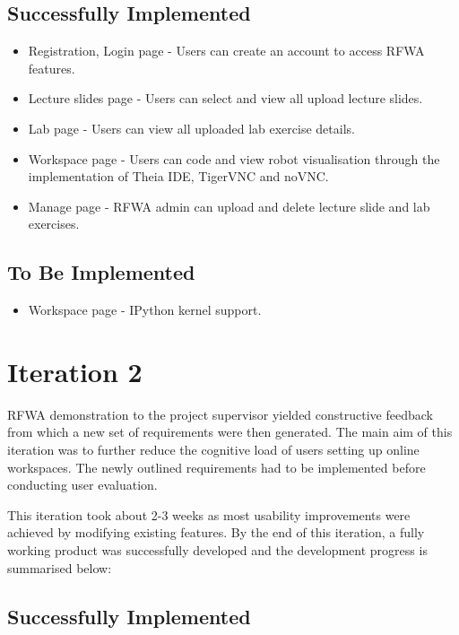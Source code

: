 \documentclass{l4proj}
\begin{document}
\subsection{Successfully Implemented}

\begin{itemize}
    \item 
    Registration, Login page - Users can create an account to access RFWA features.
    \item 
    Lecture slides page - Users can select and view all upload lecture slides.
    \item 
    Lab page - Users can view all uploaded lab exercise details.
    \item 
    Workspace page - Users can code and view robot visualisation through the implementation of Theia IDE, TigerVNC and noVNC.
    \item
    Manage page - RFWA admin can upload and delete lecture slide and lab exercises.
\end{itemize}


\subsection{To Be Implemented}

\begin{itemize}
    \item 
     Workspace page - IPython kernel support.
\end{itemize}

\section{Iteration 2}

RFWA demonstration to the project supervisor yielded constructive feedback from which a new set of requirements were then generated. The main aim of this iteration was to further reduce the cognitive load of users setting up online workspaces. The newly outlined requirements had to be implemented before conducting user evaluation.

This iteration took about 2-3 weeks as most usability improvements were achieved by modifying existing features. By the end of this iteration, a fully working product was successfully developed and the development progress is summarised below:


\subsection{Successfully Implemented}
\end{document}

